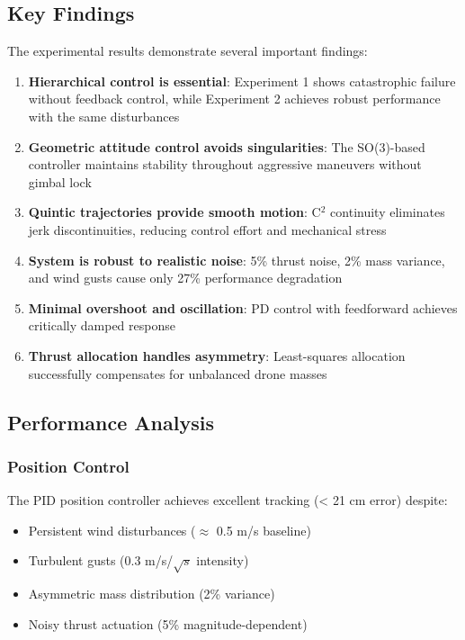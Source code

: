 \documentclass[12pt,a4paper]{article}
\begin{document}
\subsection{Key Findings}

The experimental results demonstrate several important findings:

\begin{enumerate}
    \item \textbf{Hierarchical control is essential}: Experiment 1 shows catastrophic failure without feedback control, while Experiment 2 achieves robust performance with the same disturbances
    
    \item \textbf{Geometric attitude control avoids singularities}: The SO(3)-based controller maintains stability throughout aggressive maneuvers without gimbal lock
    
    \item \textbf{Quintic trajectories provide smooth motion}: C$^2$ continuity eliminates jerk discontinuities, reducing control effort and mechanical stress
    
    \item \textbf{System is robust to realistic noise}: 5\% thrust noise, 2\% mass variance, and wind gusts cause only 27\% performance degradation
    
    \item \textbf{Minimal overshoot and oscillation}: PD control with feedforward achieves critically damped response
    
    \item \textbf{Thrust allocation handles asymmetry}: Least-squares allocation successfully compensates for unbalanced drone masses
\end{enumerate}

\subsection{Performance Analysis}

\subsubsection{Position Control}
The PID position controller achieves excellent tracking (< 21 cm error) despite:
\begin{itemize}
    \item Persistent wind disturbances ($\approx$ 0.5 m/s baseline)
    \item Turbulent gusts (0.3 m/s/$\sqrt{s}$ intensity)
    \item Asymmetric mass distribution (2\% variance)
    \item Noisy thrust actuation (5\% magnitude-dependent)
\end{itemize}
\end{document}
